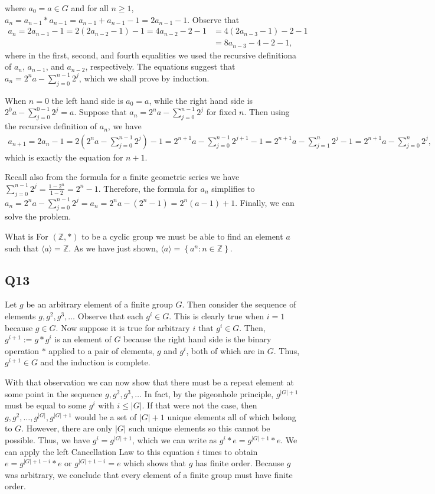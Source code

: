 \documentclass[12pt]{article}
\def\Z{{\mathbb Z}}        %
\numberwithin{theorem}{section}
\numberwithin{equation}{section}
\numberwithin{remark}{section}
\numberwithin{definition}{section}
\numberwithin{theorem}{section}
\numberwithin{lemma}{section}
\numberwithin{example}{section}
\begin{document}
where $a_0=a\in G$ and for all $n\ge1$, $a_{n}=a_{n-1}*a_{n-1}=a_{n-1}+a_{n-1}-1=2a_{n-1}-1$. Observe that
\begin{align*}
	a_n=2a_{n-1}-1=2\left(2a_{n-2}-1\right)-1=4a_{n-2}-2-1&=4\left(2a_{n-3}-1\right)-2-1\\
	&=8a_{n-3}-4-2-1,
\end{align*}
where in the first, second, and fourth equalities we used the recursive definitiona of $a_n$, $a_{n-1}$, and $a_{n-2}$, respectively. The equations suggest that $a_n=2^na-\sum_{j=0}^{n-1}2^j$, which we shall prove by induction. 

When $n=0$ the left hand side is $a_0=a$, while the right hand side is $2^0a-\sum_{j=0}^{0-1}2^j=a$. Suppose that $a_n=2^na-\sum_{j=0}^{n-1}2^j$ for fixed $n$. Then using the recursive definition of $a_n$, we have
\begin{align*}
	a_{n+1}=2a_{n}-1=2\left(2^na-\sum_{j=0}^{n-1}2^j\right)-1=2^{n+1}a-\sum_{j=0}^{n-1}2^{j+1}-1=2^{n+1}a-\sum_{j=1}^{n}2^{j}-1=2^{n+1}a-\sum_{j=0}^{n}2^{j},
\end{align*}
which is exactly the equation for $n+1$. 

Recall also from the formula for a finite geometric series we have $\sum_{j=0}^{n-1}2^j=\frac{1-2^n}{1-2}=2^n-1$. Therefore, the formula for $a_n$ simplifies to $a_n=2^na-\sum_{j=0}^{n-1}2^j=a_n=2^na-(2^n-1)=2^n(a-1)+1$. Finally, we can solve the problem. 

What is 
For $\left(\Z,*\right)$ to be a cyclic group we must be able to find an element $a$ such that $\langle a \rangle=\Z$. As we have just shown, $\langle a \rangle=\left\{a^n:n\in\Z\right\}$. 



\subsection{Q13}

Let $g$ be an arbitrary element of a finite group $G$. Then consider the sequence of elements $g,g^2,g^3,\ldots$ Observe that each $g^i\in G$. This is clearly true when $i=1$ because $g\in G$. Now suppose it is true for arbitrary $i$ that $g^i \in G$. Then, $g^{i+1}:=g*g^i$ is an element of $G$ because the right hand side is the binary operation $*$ applied to a pair of elements, $g$ and $g^i$, both of which are in $G$. Thus, $g^{i+1}\in G$ and the induction is complete. 

With that observation we can now show that there must be a repeat element at some point in the sequence $g,g^2,g^3,\ldots$ In fact, by the pigeonhole principle, $g^{|G|+1}$ must be equal to some $g^i$ with $i\le |G|$. If that were not the case, then $g,g^2,\ldots, g^{|G|},g^{|G|+1}$ would be a set of $|G|+1$ unique elements all of which belong to $G$. However, there are only $|G|$ such unique elements so this cannot be possible. Thus, we have $g^i = g^{|G|+1}$, which we can write as $g^i * e= g^{|G|+1} * e$. We can apply the left Cancellation Law to this equation $i$ times to obtain $e = g^{|G|+1-i} * e$ or $g^{|G|+1-i} = e$ which shows that $g$ has finite order. Because $g$ was arbitrary, we conclude that every element of a finite group must have finite order. 
\end{document}
